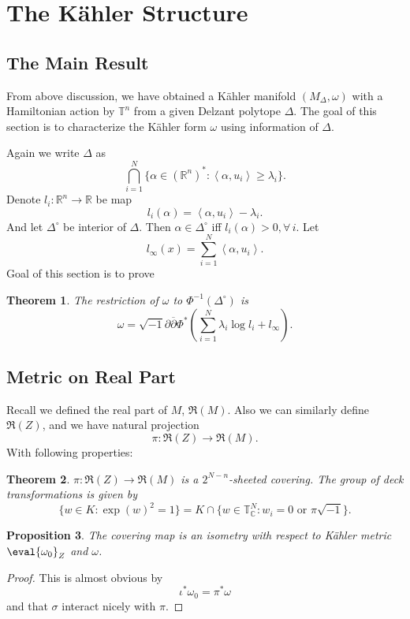 \documentclass[12pt]{article}
\theoremstyle{plain}\newtheorem{theorem}{Theorem}
\theoremstyle{definition}\newtheorem{definition}[theorem]{Definition}
\theoremstyle{definition}\newtheorem{example}[theorem]{Example}
\theoremstyle{plain}\newtheorem{axiom}[theorem]{Axiom}
\theoremstyle{plain}\newtheorem{assertion}[theorem]{Assertion}
\theoremstyle{plain}\newtheorem{corollary}[theorem]{Corollary}
\theoremstyle{plain}\newtheorem{lemma}[theorem]{Lemma}
\theoremstyle{plain}\newtheorem{proposition}[theorem]{Proposition}
\theoremstyle{plain}\newtheorem{prop}[theorem]{Proposition}
\theoremstyle{plain}\newtheorem{conjecture}[theorem]{Conjecture}
\theoremstyle{plain}\newtheorem{conj}[theorem]{Conjecture}
\theoremstyle{plain}\newtheorem{problem}[theorem]{Problem}
\theoremstyle{remark}\newtheorem{notation}[theorem]{Notation}
\theoremstyle{definition}\newtheorem*{question}{Question}
\theoremstyle{definition}\newtheorem*{answer}{Answer}
\theoremstyle{definition}\newtheorem*{goal}{Goal}
\theoremstyle{plain}\newtheorem*{application}{Application}
\theoremstyle{plain}\newtheorem*{exercise}{Exercise}
\theoremstyle{remark}\newtheorem*{remark}{Remark}
\theoremstyle{remark}\newtheorem*{note}{\small{Note}}
\numberwithin{equation}{section}
\numberwithin{theorem}{section}
\numberwithin{figure}{section}
\begin{document}
\section{The K\"ahler Structure}

\subsection{The Main Result}
From above discussion, we have obtained a K\"ahler manifold \((M_\Delta,\omega)\)
with a Hamiltonian action by \(\mathbb{T}^n\) from a given Delzant polytope \(\Delta\).
The goal of this section is to characterize the K\"ahler form \(\omega\) using
information of \(\Delta\).

Again we write \(\Delta\) as \[
    \bigcap_{i=1}^N\{\alpha\in (\mathbb{R}^n)^*:\left<\alpha,u_i\right> \ge\lambda_i\}
.\] Denote \(l_i\colon \mathbb{R}^n\to \mathbb{R}\) be map \[
    l_i(\alpha)=\left<\alpha,u_i\right> -\lambda_i
.\] And let \(\Delta^\circ \) be interior of \(\Delta\). Then \(\alpha\in\Delta^\circ\)
iff \(l_i(\alpha)>0,\forall\,i\). Let \[
    l_{\infty}(x)=\sum_{i=1}^{N}\left<\alpha,u_i\right> 
.\] Goal of this section is to prove
\begin{theorem}\label{thm:kahler-main}
    The restriction of \(\omega\) to \(\Phi^{-1}(\Delta^\circ )\) is \[
        \omega=\sqrt{-1}\partial\overline{\partial}\Phi^*
        \left(\sum_{i=1}^{N}\lambda_i \log l_i+l_\infty\right)
    .\] 
\end{theorem}

\subsection{Metric on Real Part}
Recall we defined the real part of \(M\), \(\Re(M)\). Also we can similarly define
\(\Re(Z)\), and we have natural projection \[
    \pi\colon \Re(Z)\longrightarrow \Re(M)
.\] With following properties:
\begin{theorem}\label{thm:real-part-covering}
    \(\pi\colon \Re(Z)\to \Re(M)\) is a \(2^{N-n}\)-sheeted covering. The group of
    deck transformations is given by \[
        \{w\in K:\exp(w)^2=1\}=K\cap
        \{w\in \mathbb{T}_{\mathbb{C}}^N:w_i=0\text{ or }\pi\sqrt{-1}\}
    .\] 
\end{theorem}
\begin{prop}
    The covering map is an isometry with respect to K\"ahler metric \(\eval{\omega_0}
    _{Z}\) and \(\omega\).
\end{prop}
\begin{proof}
    This is almost obvious by \[
        \iota^* \omega_0=\pi^* \omega
    \] and that \(\sigma\) interact nicely with \(\pi\).
\end{proof}
\end{document}
